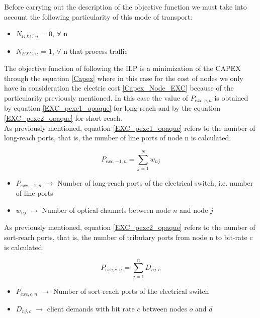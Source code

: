 Before carrying out the description of the objective function we must take into account the following particularity of this mode of transport:
\begin{itemize}
  \item $N_{OXC,n}$ = 0, \quad $\forall$ n
  \item $N_{EXC,n}$ = 1, \quad $\forall$ n that process traffic
\end{itemize}


\vspace{11pt}
The objective function of following the ILP is a minimization of the CAPEX through the equation \ref{Capex} where in this case for the cost of nodes we only have in consideration the electric cost \ref{Capex_Node_EXC} because of the particularity previously mentioned.
In this case the value of $P_{exc,c,n}$ is obtained by equation \ref{EXC_pexc1_opaque} for long-reach and by the equation \ref{EXC_pexc2_opaque} for short-reach.\\

\newpage
As previously mentioned, equation \ref{EXC_pexc1_opaque} refers to the number of long-reach ports, that is, the number of line ports of node n is calculated.

\begin{equation}
P_{exc,-1,n} = \sum_{j=1}^{N} w_{nj}
\label{EXC_pexc1_opaque}
\end{equation}

\begin{itemize}
\item{$P_{exc,-1,n}$	$\rightarrow$	Number of long-reach ports of the electrical switch, i.e. number of line ports}
\item{$w_{nj}$			$\rightarrow$	Number of optical channels between node $n$ and node $j$}
\end{itemize}

\vspace{11pt}
As previously mentioned, equation \ref{EXC_pexc2_opaque} refers to the number of sort-reach ports, that is, the number of tributary ports from node n to bit-rate c is calculated.

\begin{equation}
P_{exc,c,n} = \sum_{j=1}^{n} D_{nj,c} 
\label{EXC_pexc2_opaque}
\end{equation}

\begin{itemize}
\item{$P_{exc,c,n}$	$\rightarrow$	Number of sort-reach ports of the electrical switch}
\item{$D_{nj,c}$	$\rightarrow$	client demands with bit rate $c$ between nodes $o$ and $d$}
\end{itemize}

